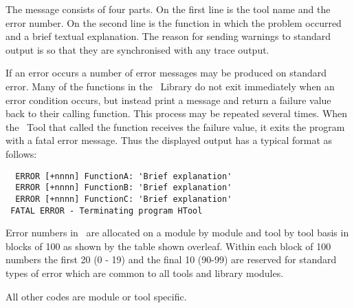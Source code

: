 The message consists of four parts.  On the first line is the tool name and the error number.
On the second line is the function in which the
problem occurred and a brief textual explanation.
The reason for sending warnings to standard output is so that they are 
synchronised with any trace output.

If an error occurs a number of error messages may be produced on
standard error. Many of the functions in the \HTK\ Library do not exit
immediately when an error condition occurs, but instead print a message and return a failure
value back to their calling function. This process may be repeated several
times. When the \HTK\ Tool that called the function receives the failure
value, it exits the program with a fatal error message. Thus the
displayed output has a typical format as follows:

\begin{verbatim}
  ERROR [+nnnn] FunctionA: 'Brief explanation'
  ERROR [+nnnn] FunctionB: 'Brief explanation'
  ERROR [+nnnn] FunctionC: 'Brief explanation'
 FATAL ERROR - Terminating program HTool
\end{verbatim}

Error numbers in \HTK\ are allocated on a module by module
and tool by tool basis in blocks of 100 as shown by the table shown
overleaf.
Within each block of 100 numbers the first 20 (0 - 19)
and the final 10 (90-99) are reserved for standard types 
of error which are common to all tools and library 
modules.

All other codes are module or tool specific.


